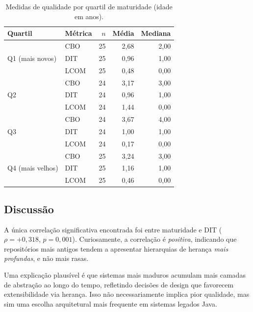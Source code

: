 \documentclass[12pt,a4paper]{article}
\begin{document}
\begin{table}[htbp]
\centering
\caption{Medidas de qualidade por quartil de maturidade (idade em anos).}
\label{tab:rq02_quartis}
\small
\begin{tabular}{llrrr}
\toprule
\textbf{Quartil} & \textbf{Métrica} & \textbf{$n$} & \textbf{Média} & \textbf{Mediana} \\
\midrule
\multirow{3}{*}{Q1 (mais novos)} & CBO & 25 & 2,68 & 2,00 \\
                                  & DIT & 25 & 0,96 & 1,00 \\
                                  & LCOM& 25 & 0,48 & 0,00 \\
\midrule
\multirow{3}{*}{Q2}               & CBO & 24 & 3,17 & 3,00 \\
                                  & DIT & 24 & 0,96 & 1,00 \\
                                  & LCOM& 24 & 1,44 & 0,00 \\
\midrule
\multirow{3}{*}{Q3}               & CBO & 24 & 3,67 & 4,00 \\
                                  & DIT & 24 & 1,00 & 1,00 \\
                                  & LCOM& 24 & 0,17 & 0,00 \\
\midrule
\multirow{3}{*}{Q4 (mais velhos)} & CBO & 25 & 3,24 & 3,00 \\
                                  & DIT & 25 & 1,16 & 1,00 \\
                                  & LCOM& 25 & 0,46 & 0,00 \\
\bottomrule
\end{tabular}
\end{table}

\subsection{Discussão}

A única correlação significativa encontrada foi entre maturidade e DIT
($\rho = +0{,}318$, $p = 0{,}001$). Curiosamente, a correlação é \emph{positiva},
indicando que repositórios mais antigos tendem a apresentar hierarquias de
herança \emph{mais profundas}, e não mais rasas.

Uma explicação plausível é que sistemas mais maduros acumulam mais camadas
de abstração ao longo do tempo, refletindo decisões de design que favorecem
extensibilidade via herança. Isso não necessariamente implica pior qualidade,
mas sim uma escolha arquitetural mais frequente em sistemas legados Java.
\end{document}
